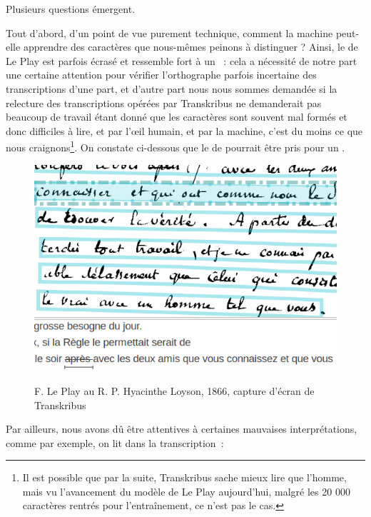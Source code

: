 Plusieurs questions émergent.

Tout d'abord, d'un point de vue purement technique, comment la machine peut-elle apprendre des caractères que nous-mêmes peinons à distinguer ? Ainsi, le  de Le Play est parfois écrasé et ressemble fort à un ~: cela a nécessité de notre part une certaine attention pour vérifier l'orthographe parfois incertaine des transcriptions d'une part, et d'autre part nous nous sommes demandée si la relecture des transcriptions opérées par Transkribus ne demanderait pas beaucoup de travail étant donné que les caractères sont souvent mal formés et donc difficiles à lire, et par l'\oe il humain, et par la machine, c'est du moins ce que nous craignons\footnote{Il est possible que par la suite, Transkribus sache mieux lire que l'homme, mais vu l'avancement du modèle de Le Play aujourd'hui, malgré les 20 000 caractères rentrés pour l'entraînement, ce n'est pas le cas.}. On constate ci-dessous que le  de  pourrait être pris pour un .

\begin{figure}[ht]
    \centering
    \caption{F. Le Play au R. P. Hyacinthe Loyson, 1866, capture d'écran de Transkribus}
    \includegraphics[width=12cm]{images/r-zTranskribus.png}
    \label{r-zTranskribus}
\end{figure}

Par ailleurs, nous avons dû être attentives à certaines mauvaises interprétations, comme par exemple, on lit dans la transcription~: 

